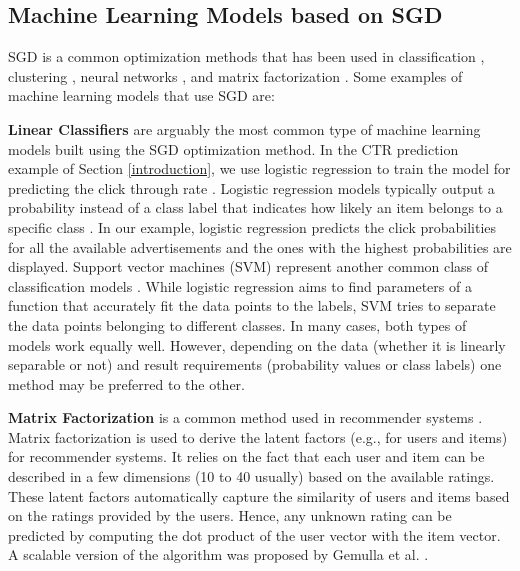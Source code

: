 \documentclass{vldb}
\begin{document}
\subsection{Machine Learning Models based on SGD}\label{subsec:ml-models-sgd}
SGD is a common optimization methods that has been used in classification \cite{zhang2004solving}, clustering \cite{bottou1995convergence}, neural networks \cite{dean2012large}, and matrix factorization \cite{funk2006netflix}.
Some examples of machine learning models that use SGD are: 

\textbf{Linear Classifiers} are arguably the most common type of machine learning models built using the SGD optimization method. 
In the CTR prediction example of Section \ref{introduction}, we use logistic regression to train the model for predicting the click through rate \cite{macmahan2013}. 
Logistic regression models typically output a probability instead of a class label that indicates how likely an item belongs to a specific class \cite{hosmer2013applied}.
In our example, logistic regression predicts the click probabilities for all the available advertisements and the ones with the highest probabilities are displayed.
Support vector machines (SVM) represent another common class of classification models \cite{steinwart2008support}.
While logistic regression aims to find parameters of a function that accurately fit the data points to the labels, SVM tries to separate the data points belonging to different classes. 
In many cases, both types of models work equally well.
However, depending on the data (whether it is linearly separable or not) and result requirements (probability values or class labels) one method may be preferred to the other.

\textbf{Matrix Factorization} is a common method used in recommender systems \cite{koren2009matrix}. 
Matrix factorization is used to derive the latent factors (e.g., for users and items) for recommender systems.
It relies on the fact that each user and item can be described in a few dimensions (10 to 40 usually) based on the available ratings.
These latent factors automatically capture the similarity of users and items based on the ratings provided by the users.
Hence, any unknown rating can be predicted by computing the dot product of the user vector with the item vector.
A scalable version of the algorithm was proposed by Gemulla et al. \cite{gemulla2011large}.
\end{document}
